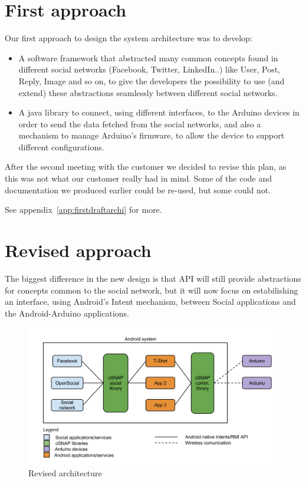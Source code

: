 \section{First approach}

Our first approach to design the system architecture was to develop:

\begin{itemize}
\item A software framework that
abstracted many common concepts found in different social networks (Facebook, Twitter, LinkedIn..)
like User, Post, Reply, Image and so on, to give the developers the possibility to use
(and extend) these abstractions seamlessly between different social networks.

\item A java library to connect, using different interfaces, to the Arduino devices in order
to send the data fetched from the social networks, and also a mechanism to manage Arduino's firmware,
to allow the device to support different configurations.
\end{itemize}

After the second meeting with the customer we decided to revise this plan, as this was not what
our customer really had in mind. Some of the code and documentation we produced earlier could be re-used, but some could not.

See appendix~\ref{app:firstdraftarchi} for more.

\newpage

\section{Revised approach}
The biggest difference in the new design is that API will still provide abstractions
for concepts common to the social network, but it will now focus on estabilishing an interface,
using Android's Intent mechanism, between Social applications and the Android-Arduino applications.

\begin{figure}[h!]
\centering \includegraphics[scale=0.35]{img/architecture-toplevel.png}
\caption{Revised architecture}
\label{fig:architecture-toplevel}
\end{figure}

